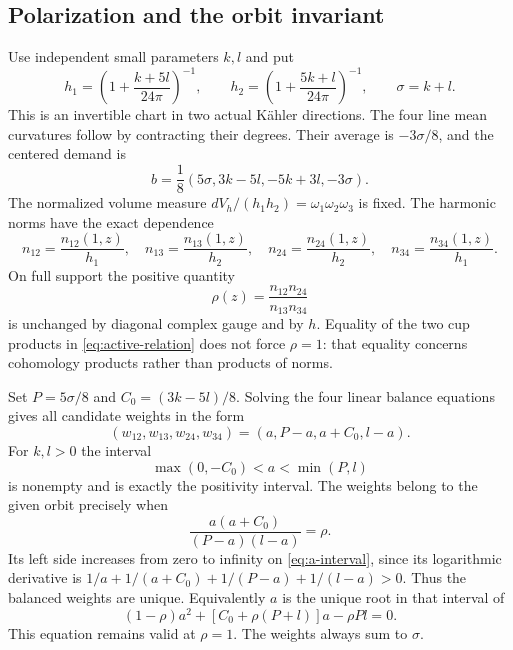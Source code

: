 \documentclass[11pt]{amsart}
\theoremstyle{definition}
\theoremstyle{remark}
\begin{document}
\subsection{Polarization and the orbit invariant}
Use independent small parameters $k,l$ and put
\begin{equation}\label{eq:diamond-polarization}
 h_1=\left(1+\frac{k+5l}{24\pi}\right)^{-1},\qquad
 h_2=\left(1+\frac{5k+l}{24\pi}\right)^{-1},\qquad \sigma=k+l.
\end{equation}
This is an invertible chart in two actual K\"ahler directions. The four
line mean curvatures follow by contracting their degrees. Their average
is $-3\sigma/8$, and the centered demand is
\begin{equation}\label{eq:diamond-b}
 b=\frac18(5\sigma,3k-5l,-5k+3l,-3\sigma).
\end{equation}
The normalized volume measure $dV_h/(h_1h_2)=\omega_1\omega_2\omega_3$
is fixed. The harmonic norms have the exact dependence
\begin{equation}\label{eq:diamond-norms}
 n_{12}=\frac{n_{12}(1,z)}{h_1},\quad
 n_{13}=\frac{n_{13}(1,z)}{h_2},\quad
 n_{24}=\frac{n_{24}(1,z)}{h_2},\quad
 n_{34}=\frac{n_{34}(1,z)}{h_1}.
\end{equation}
On full support the positive quantity
\begin{equation}\label{eq:rho}
 \rho(z)=\frac{n_{12}n_{24}}{n_{13}n_{34}}
\end{equation}
is unchanged by diagonal complex gauge and by $h$. Equality of the two
cup products in \eqref{eq:active-relation} does not force $\rho=1$:
that equality concerns cohomology products rather than products of norms.

Set $P=5\sigma/8$ and $C_0=(3k-5l)/8$. Solving the four linear balance
equations gives all candidate weights in the form
\begin{equation}\label{eq:diamond-weights}
 (w_{12},w_{13},w_{24},w_{34})=(a,P-a,a+C_0,l-a).
\end{equation}
For $k,l>0$ the interval
\begin{equation}\label{eq:a-interval}
 \max(0,-C_0)<a<\min(P,l)
\end{equation}
is nonempty and is exactly the positivity interval. The weights belong
to the given orbit precisely when
\begin{equation}\label{eq:a-equation}
 \frac{a(a+C_0)}{(P-a)(l-a)}=\rho.
\end{equation}
Its left side increases from zero to infinity on \eqref{eq:a-interval},
since its logarithmic derivative is
$1/a+1/(a+C_0)+1/(P-a)+1/(l-a)>0$. Thus the balanced weights are unique.
Equivalently $a$ is the unique root in that interval of
\[
 (1-\rho)a^2+[C_0+\rho(P+l)]a-\rho Pl=0.
\]
This equation remains valid at $\rho=1$. The weights always sum to
$\sigma$.
\end{document}
